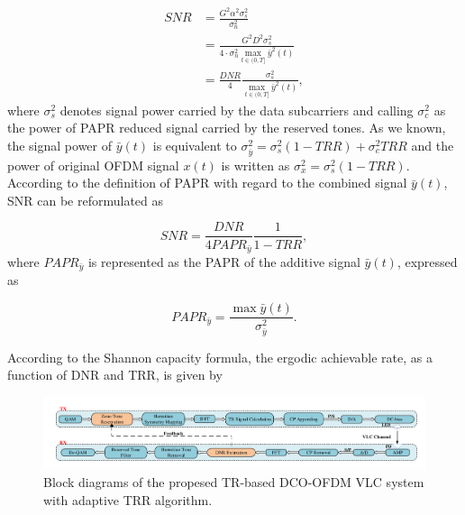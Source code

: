 \documentclass[9pt,twocolumn,twoside]{osajnl}
\begin{document}
\begin{align}
  SNR & = \frac{G^2\alpha^2\sigma^2_s}{\sigma^2_n} \\
  & = \frac{G^2D^2\sigma_s^2}{4\cdot \sigma_n^2 \max\limits_{t \in (0,T]} {\bar{y}^2(t)}} \\
  & = \frac{DNR}{4} \frac{\sigma_s^2}{\max\limits_{t \in (0,T]}{\bar{y}^2(t)}},
\end{align}
where $\sigma_s^2$ denotes signal power carried by the data subcarriers and calling $\sigma_c^2$ as the power of PAPR reduced signal carried by the reserved tones. 
As we known, the signal power of $\bar{y}(t)$ is equivalent to $\sigma^2_{\bar{y}}=\sigma^2_s (1-TRR) + \sigma^2_c TRR$ and the power of original OFDM signal $x(t)$ 
is written as $\sigma_x^2=\sigma_s^2 (1-TRR)$. According to the definition of PAPR with regard to the combined signal $\bar{y}(t)$, SNR can be reformulated as

\begin{equation}
  SNR = \frac{DNR}{4 PAPR_{\bar{y}}} \frac{1}{1-TRR}
  \label{eq:SNR_TRR_},
\end{equation}
where $PAPR_{\bar{y}}$ is represented as the PAPR of the additive signal $\bar{y}(t)$, expressed as

\begin{equation}
  PAPR_{\bar{y}} = \frac{\max{\bar{y}(t)}}{\sigma^2_{\bar{y}}}.
\end{equation}

According to the Shannon capacity formula, the ergodic achievable rate, as a function of DNR and TRR, is given by

\begin{figure}[t]
  \centering
  \includegraphics[width=\linewidth]{figures/Ada_DCO_TR_System.pdf}
  \caption{Block diagrams of the propesed TR-based DCO-OFDM VLC system with adaptive TRR algorithm.}
  \label{fig:ada_DCO_TR}
\end{figure}
\end{document}
